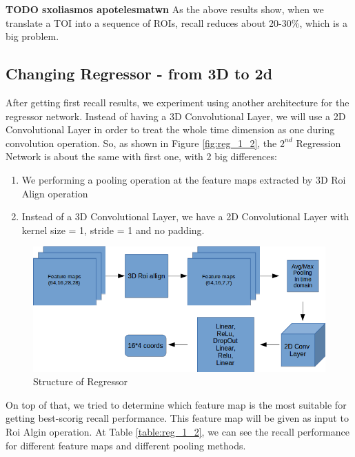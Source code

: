 \documentclass{report}
\begin{document}
\textbf{TODO sxoliasmos apotelesmatwn}
As the above results show, when we translate a TOI into a sequence of ROIs, recall reduces about 20-30\%, which is a big problem. 
\subsection{Changing Regressor - from 3D to 2d}
After getting first recall results, we experiment using another architecture for the regressor network. Instead of having a 3D Convolutional
Layer, we will use a 2D Convolutional Layer in order to treat the whole time dimension as one during convolution operation. So, as shown in Figure \ref{fig:reg_1_2},
the $2^{nd}$ Regression Network is about the same with first one, with 2 big differences:
\begin{enumerate}
\item We performing a pooling operation at the feature maps extracted by 3D Roi Align operation
\item Instead of a 3D Convolutional Layer, we have a 2D Convolutional Layer with kernel size = 1, stride = 1 and no padding.
\end{enumerate}

\begin{figure}[h]

  \centering
  \includegraphics[scale=0.48]{regressor_1_2}
  \caption{Structure of Regressor}
  \label{fig:regressor_2d}
\end{figure}

On top of that, we tried to determine which feature map is the most suitable  for getting best-scorig recall performance. This feature map will be given as
input to Roi Algin operation.  At Table \ref{table:reg_1_2}, we can see the recall performance for different feature maps and different pooling methods.
\end{document}

